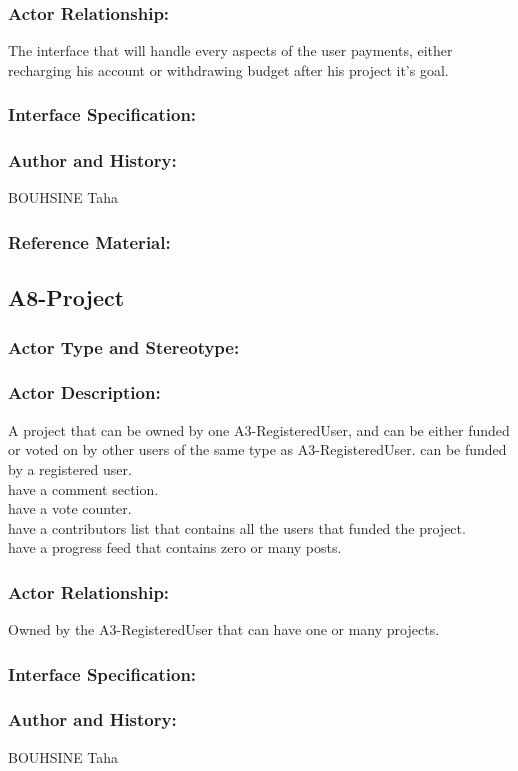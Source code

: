 \documentclass[11pt, openany]{report}
\begin{document}
\subsubsection{Actor Relationship:}
The interface that will handle every aspects of the user payments, either recharging his account or withdrawing budget after his project it's goal.
\subsubsection{Interface Specification:}
\subsubsection{Author and History:}
BOUHSINE Taha
\subsubsection{Reference Material:}

\clearpage
\subsection{A8-Project}
\label{A8}
\subsubsection{Actor Type and Stereotype:}
\subsubsection{Actor Description:}
A project that can be owned by one A3-RegisteredUser, and can be either funded or voted on by other users of the same type as A3-RegisteredUser.
can be funded by a registered user.\\
have a comment section.\\
have a vote counter.\\
have a contributors list that contains all the users that funded the project.\\
have a progress feed that contains zero or many posts.
\subsubsection{Actor Relationship:}
Owned by the A3-RegisteredUser that can have one or many projects.
\subsubsection{Interface Specification:}
\subsubsection{Author and History:}
BOUHSINE Taha
\end{document}
